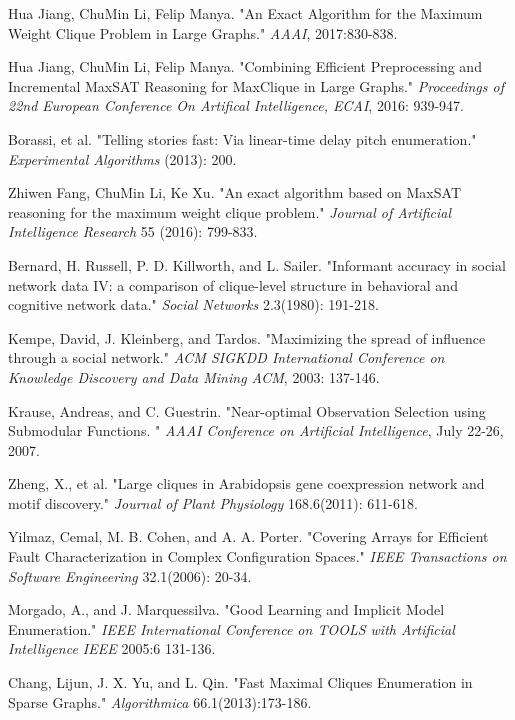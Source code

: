 \documentclass{llncs}
\begin{document}
\begin{thebibliography}{}

Hua Jiang, ChuMin Li, Felip Manya.
"An Exact Algorithm for the Maximum Weight Clique Problem in Large Graphs."
{\it AAAI}, 2017:830-838.

Hua Jiang, ChuMin Li, Felip Manya.
"Combining Efficient Preprocessing and Incremental MaxSAT Reasoning for MaxClique in Large Graphs."
{\it Proceedings of 22nd European Conference On Artifical Intelligence, ECAI}, 2016: 939-947.

Borassi, et al.
"Telling stories fast: Via linear-time delay pitch enumeration."
{\it Experimental Algorithms} (2013): 200.

Zhiwen Fang, ChuMin Li, Ke Xu.
"An exact algorithm based on MaxSAT reasoning for the maximum weight clique problem."
{\it Journal of Artificial Intelligence Research} 55 (2016): 799-833.

Bernard, H. Russell, P. D. Killworth, and L. Sailer.
"Informant accuracy in social network data IV: a comparison of clique-level structure in behavioral and cognitive network data."
{\it Social Networks} 2.3(1980): 191-218.

Kempe, David, J. Kleinberg, and Tardos.
"Maximizing the spread of influence through a social network."
{\it ACM SIGKDD International Conference on Knowledge Discovery and Data Mining ACM}, 2003: 137-146.

Krause, Andreas, and C. Guestrin.
"Near-optimal Observation Selection using Submodular Functions. "
{\it AAAI Conference on Artificial Intelligence}, July 22-26, 2007.

Zheng, X., et al.
"Large cliques in Arabidopsis gene coexpression network and motif discovery."
{\it Journal of Plant Physiology} 168.6(2011): 611-618.

Yilmaz, Cemal, M. B. Cohen, and A. A. Porter.
"Covering Arrays for Efficient Fault Characterization in Complex Configuration Spaces."
{\it IEEE Transactions on Software Engineering} 32.1(2006): 20-34.


Morgado, A., and J. Marquessilva.
"Good Learning and Implicit Model Enumeration."
{\it IEEE International Conference on TOOLS with Artificial Intelligence IEEE} 2005:6 131-136.

Chang, Lijun, J. X. Yu, and L. Qin.
"Fast Maximal Cliques Enumeration in Sparse Graphs."
{\it Algorithmica} 66.1(2013):173-186.


\end{thebibliography}
\end{document}
